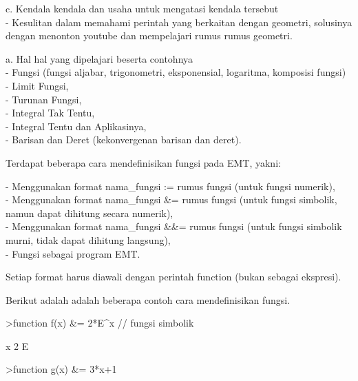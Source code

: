 \documentclass[a4paper,10pt]{article}
\begin{document}
\begin{eulernotebook}
\begin{eulercomment}
\begin{eulercomment}
\begin{eulercomment}
\begin{eulercomment}
\begin{eulercomment}
\begin{eulercomment}
\begin{eulercomment}
\begin{eulercomment}
\begin{eulercomment}
c. Kendala kendala dan usaha untuk mengatasi kendala tersebut\\
- Kesulitan dalam memahami perintah yang berkaitan dengan geometri,
solusinya dengan menonton youtube dan mempelajari rumus rumus
geometri.\\
\end{eulercomment}
\eulersubheading{}
\begin{eulercomment}
a. Hal hal yang dipelajari beserta contohnya\\
- Fungsi (fungsi aljabar, trigonometri, eksponensial, logaritma,
komposisi fungsi)\\
- Limit Fungsi,\\
- Turunan Fungsi,\\
- Integral Tak Tentu,\\
- Integral Tentu dan Aplikasinya,\\
- Barisan dan Deret (kekonvergenan barisan dan deret).


\end{eulercomment}
\begin{eulercomment}
Terdapat beberapa cara mendefinisikan fungsi pada EMT, yakni:

- Menggunakan format nama\_fungsi := rumus fungsi (untuk fungsi
numerik),\\
- Menggunakan format nama\_fungsi \&= rumus fungsi (untuk fungsi
simbolik, namun dapat dihitung secara numerik),\\
- Menggunakan format nama\_fungsi \&\&= rumus fungsi (untuk fungsi
simbolik murni, tidak dapat dihitung langsung),\\
- Fungsi sebagai program EMT.

Setiap format harus diawali dengan perintah function (bukan sebagai
ekspresi).

Berikut adalah adalah beberapa contoh cara mendefinisikan fungsi.
\end{eulercomment}
\begin{eulerprompt}
>function f(x) &= 2*E^x // fungsi simbolik
\end{eulerprompt}
\begin{euleroutput}
  
                                      x
                                   2 E
  
\end{euleroutput}
\begin{eulerprompt}
>function g(x) &= 3*x+1
\end{eulerprompt}
\begin{euleroutput}
  

\end{euleroutput}
\end{eulercomment}
\end{eulercomment}
\end{eulercomment}
\end{eulercomment}
\end{eulercomment}
\end{eulercomment}
\end{eulercomment}
\end{eulercomment}
\end{eulernotebook}
\end{document}
